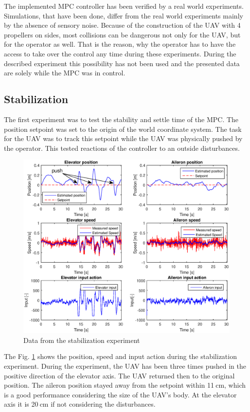 \documentclass[a4paper,11pt,titlepage]{article}
\newcommand{\jed}[1]{\ensuremath{~\mathrm{#1}}}
\begin{document}
The implemented MPC controller has been verified by a real world experiments. Simulations, that have been done, differ from the real world experiments mainly by the absence of sensory noise. Because of the construction of the UAV with 4 propellers on sides, most collisions can be dangerous not only for the UAV, but for the operator as well. That is the reason, why the operator has to have the access to take over the control any time during these experiments. During the described experiment this possibility has not been used and the presented data are solely while the MPC was in control.

\subsection{Stabilization}
The first experiment was to test the stability and settle time of the MPC. The position setpoint was set to the origin of the world coordinate system. The task for the UAV was to track this setpoint while the UAV was physically pushed by the operator. This tested reactions of the controller to an outside disturbances.


\begin{figure}[h]
\centering
\includegraphics[width=1\textwidth]{fig/balancing.eps}
\caption{Data from the stabilization experiment}
\label{fig:stabilization}
\end{figure}

The Fig. \ref{fig:stabilization} shows the position, speed and input action during the stabilization experiment. During the experiment, the UAV has been three times pushed in the positive direction of the elevator axis. The UAV returned then to the original position. The aileron position stayed away from the setpoint within 11\jed{cm}, which is a good performance considering the size of the UAV's body. At the elevator axis it is 20\jed{cm} if not considering the disturbances.
\end{document}
